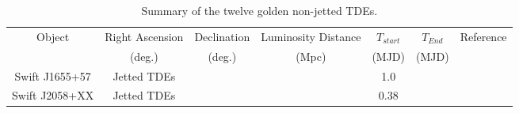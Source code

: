 \documentclass[twocolumn, tighten, linenumbers]{aastex62}
\begin{document}
\begin{table}
	\centering
	\begin{tabular}{||c c c c ccc|} 
		\hline
		Object & Right Ascension &  Declination  & Luminosity Distance & $T_{start}$ & $T_{End}$ & Reference\\ [0.5ex] 
		& (deg.) & (deg.) & (Mpc) &(MJD) & (MJD) &\\
		\hline\hline
		Swift J1655+57 & Jetted TDEs & && 1.0\\ 
		\hline
		Swift J2058+XX & Jetted TDEs & & & 0.38\\[1ex] 
		\hline
	\end{tabular}
	\caption{Summary of the twelve golden non-jetted TDEs.}
	\label{tab:gold_cat}
\end{table}
\end{document}
